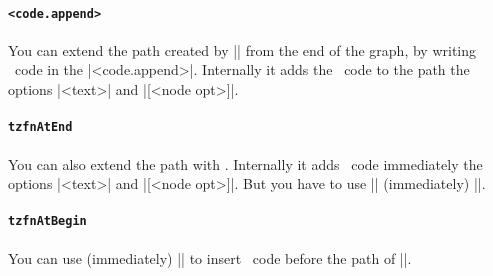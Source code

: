 \paragraph{\texttt{<code.append>}}
You can extend the path created by |\tzfn| from the end of the graph, by writing \Tikz\ code in the  |<code.append>|. Internally it adds the \Tikz\ code to the path  the options |{<text>}| and |[<node opt>]|.

\begin{tzcode}{.3}
\end{tzcode}

\paragraph{\texttt{\bs tzfnAtEnd}}
You can also extend the path with \icmd{\tzfnAtEnd}.
Internally it adds \Tikz\ code immediately  the options |{<text>}| and |[<node opt>]|. But you have to use |\tzfnAtEnd| (immediately)  |\tzfn|.

\begin{tzcode}{.3}
\end{tzcode}


\paragraph{\texttt{\bs tzfnAtBegin}}
You can use \icmd{\tzfnAtBegin} (immediately)  |\tzfn| to insert \Tikz\ code before the path of |\tzfn|.

\begin{tzcode}{.3}
\end{tzcode}


